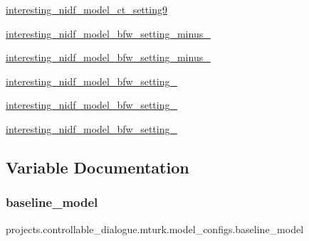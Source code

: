 \begin{DoxyCompactItemize}
\item 
\hyperlink{namespaceprojects_1_1controllable__dialogue_1_1mturk_1_1model__configs_a2a848c1a2c8496345dfc4c79645bd595}{interesting\+\_\+nidf\+\_\+model\+\_\+ct\+\_\+setting9}
\item 
\hyperlink{namespaceprojects_1_1controllable__dialogue_1_1mturk_1_1model__configs_a508c27830fb225b4e4c258d0f5ed8687}{interesting\+\_\+nidf\+\_\+model\+\_\+bfw\+\_\+setting\+\_\+minus\+\_}
\item 
\hyperlink{namespaceprojects_1_1controllable__dialogue_1_1mturk_1_1model__configs_a6175ac577fea4f1222300f03fbb774c3}{interesting\+\_\+nidf\+\_\+model\+\_\+bfw\+\_\+setting\+\_\+minus\+\_}
\item 
\hyperlink{namespaceprojects_1_1controllable__dialogue_1_1mturk_1_1model__configs_a0f4232c72c81e9ac958399b913b61052}{interesting\+\_\+nidf\+\_\+model\+\_\+bfw\+\_\+setting\+\_}
\item 
\hyperlink{namespaceprojects_1_1controllable__dialogue_1_1mturk_1_1model__configs_aeef7cbedbfdab31d2aa158d7504c44da}{interesting\+\_\+nidf\+\_\+model\+\_\+bfw\+\_\+setting\+\_}
\item 
\hyperlink{namespaceprojects_1_1controllable__dialogue_1_1mturk_1_1model__configs_ac962f88036693bfcb9e00a9b66956129}{interesting\+\_\+nidf\+\_\+model\+\_\+bfw\+\_\+setting\+\_}
\end{DoxyCompactItemize}


\subsection{Variable Documentation}
\mbox{\label{namespaceprojects_1_1controllable__dialogue_1_1mturk_1_1model__configs_a40b9ee7ac11c460651edbe296aa751eb}} 
\subsubsection{\texorpdfstring{baseline\+\_\+model}{baseline\_model}}
{\footnotesize\ttfamily projects.\+controllable\+\_\+dialogue.\+mturk.\+model\+\_\+configs.\+baseline\+\_\+model}



